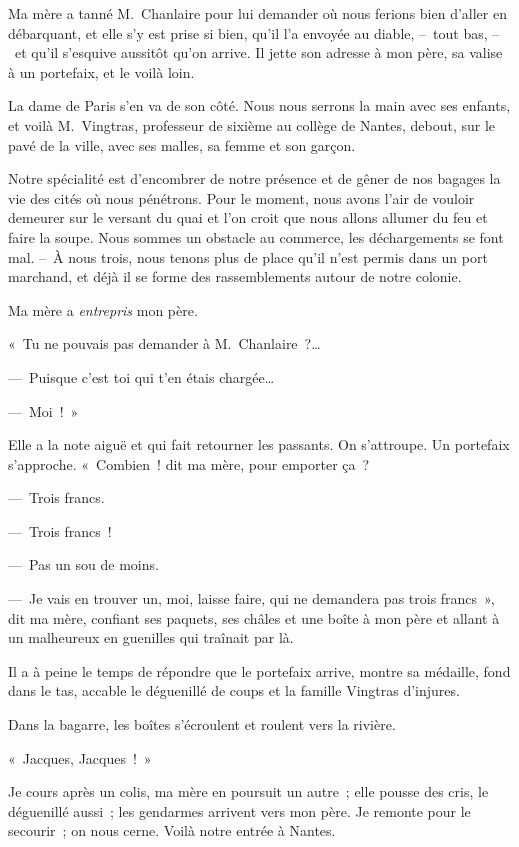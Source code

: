 \documentclass[french,twoside]{book} %
\begin{document}
\noindent Ma mère a tanné M. Chanlaire pour lui demander où nous ferions bien d’aller en débarquant, et elle s’y est prise si bien, qu’il l’a envoyée au diable, – tout bas, – et qu’il s’esquive aussitôt qu’on arrive. Il jette son adresse à mon père, sa valise à un portefaix, et le voilà loin.\par
La dame de Paris s’en va de son côté. Nous nous serrons la main avec ses enfants, et voilà M. Vingtras, professeur de sixième au collège de Nantes, debout, sur le pavé de la ville, avec ses malles, sa femme et son garçon.\par
\bigbreak
\noindent Notre spécialité est d’encombrer de notre présence et de gêner de nos bagages la vie des cités où nous pénétrons. Pour le moment, nous avons l’air de vouloir demeurer sur le versant du quai et l’on croit que nous allons allumer du feu et faire la soupe. Nous sommes un obstacle au commerce, les déchargements se font mal. – À nous trois, nous tenons plus de place qu’il n’est permis dans un port marchand, et déjà il se forme des rassemblements autour de notre colonie.\par
Ma mère a \emph{entrepris} mon père.\par
« Tu ne pouvais pas demander à M. Chanlaire ?…\par
— Puisque c’est toi qui t’en étais chargée…\par
— Moi ! »\par
Elle a la note aiguë et qui fait retourner les passants. On s’attroupe. Un portefaix s’approche. « Combien ! dit ma mère, pour emporter ça ?\par
— Trois francs.\par
— Trois francs !\par
— Pas un sou de moins.\par
— Je vais en trouver un, moi, laisse faire, qui ne demandera pas trois francs », dit ma mère, confiant ses paquets, ses châles et une boîte à mon père et allant à un malheureux en guenilles qui traînait par là.\par
Il a à peine le temps de répondre que le portefaix arrive, montre sa médaille, fond dans le tas, accable le déguenillé de coups et la famille Vingtras d’injures.\par
Dans la bagarre, les boîtes s’écroulent et roulent vers la rivière.\par
« Jacques, Jacques ! »\par
Je cours après un colis, ma mère en poursuit un autre ; elle pousse des cris, le déguenillé aussi ; les gendarmes arrivent vers mon père. Je remonte pour le secourir ; on nous cerne. Voilà notre entrée à Nantes.\par
\end{document}
